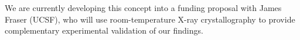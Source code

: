\documentclass[10pt]{article}
\begin{document}
We are currently developing this concept into a funding proposal with James Fraser (UCSF), who will use room-temperature X-ray crystallography to provide complementary experimental validation of our findings.


\eject
\small

 

\end{document}
